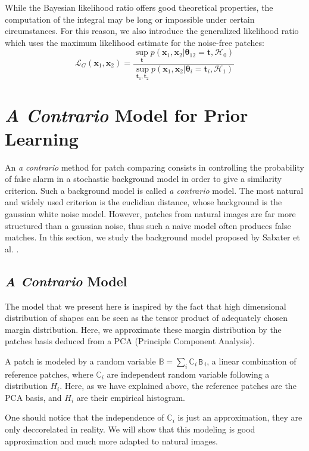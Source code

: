 \documentclass[runningheads]{llncs}
\newcommand{\mat}[1]{\ensuremath{\,\mathtt{#1}\,}}
\newcommand{\rand}[1]{\ensuremath{\mathbb{#1}}}
\begin{document}
While the Bayesian likelihood ratio offers good theoretical properties, the computation of the integral may be long or impossible under certain circumstances. For this reason, we also introduce the generalized likelihood ratio which uses the maximum likelihood estimate for the noise-free patches:
\[
\mathcal{L}_G(\mathbf{x}_1,\mathbf{x}_2)=\frac{\sup_{\mathbf{t}}p(\mathbf{x}_1,\mathbf{x}_2|\boldsymbol\theta_{12}=\mathbf{t}, \mathcal{H}_0)}{\sup_{\mathbf{t}_1,\mathbf{t}_2}p(\mathbf{x}_1,\mathbf{x}_2|\boldsymbol\theta_i=\mathbf{t}_i, \mathcal{H}_1)}
\]

\section{\textit{A Contrario} Model for Prior Learning}

An \textit{a contrario} method for patch comparing consists in controlling the probability of false alarm in a stochastic background model in order to give a similarity criterion. Such a background model is called \textit{a contrario} model. The most natural and widely used criterion is the euclidian distance, whose background is the gaussian white noise model. However, patches from natural images are far more structured than a gaussian noise, thus such a naive model often produces false matches. In this section, we study the background model proposed by Sabater et al. \cite{Sabater:2012}.
\subsection{\textit{A Contrario} Model}

The model that we present here is inspired by the fact that high dimensional distribution of shapes can be seen as the tensor product of adequately chosen margin distribution. Here, we approximate these margin distribution by the patches basis deduced from a PCA (Principle Component Analysis). 

A patch is modeled by a random variable $\rand{B}=\sum_i \rand{C}_i \mat{B}_i$, a linear combination of reference patches, where $\rand{C}_i$ are independent random variable following a distribution $H_i$. Here, as we have explained above, the reference patches are the PCA basis, and $ H_i$ are their empirical histogram.

One should notice that the independence of $\rand{C}_i$ is just an approximation, they are only deccorelated in reality. We will show that this modeling is good approximation and much more adapted to natural images.
\end{document}
